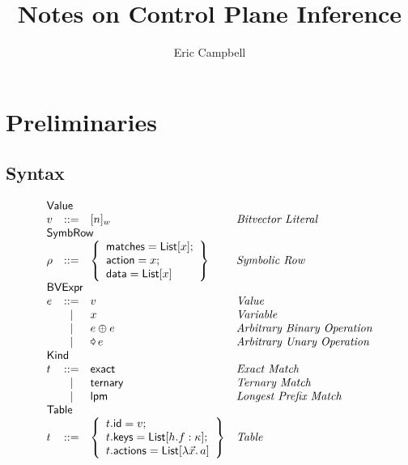 \documentclass{article}
\title{Notes on Control Plane Inference}
\author{Eric Campbell}
\newcommand{\binop}{\mathbin{\oplus}}
\newcommand{\unop}{\mathop{\text{\pointer}}}
\newcommand{\Value}{\mathsf{Value}}
\newcommand{\BVExpr}{\mathsf{BVExpr}}
\newcommand{\Table}{\mathsf{Table}}
\newcommand{\List}{\mathsf{List}}
\newcommand{\SymbRow}{\mathsf{SymbRow}}
\newcommand{\Kind}{\mathsf{Kind}}
\newcommand{\matches}{\mathsf{matches}}
\newcommand{\action}{\mathsf{action}}
\newcommand{\actions}{\mathsf{actions}}
\newcommand{\keys}{\mathsf{keys}}
\newcommand{\data}{\mathsf{data}}
\newcommand{\id}{\mathsf{id}}
\newcommand{\exact}{\ensuremath{\mathsf{exact}}}
\newcommand{\ternary}{\ensuremath{\mathsf{ternary}}}
\newcommand{\lpm}{\ensuremath{\mathsf{lpm}}}
\begin{document}
\maketitle

\section{Preliminaries}

\subsection{Syntax}

\begin{figure}[htp]
  \[\begin{array}{lclll}
    \multicolumn{3}{l}{\Value} \\
    v & ::= & [n]_w  & \textit{Bitvector Literal} \\
    \multicolumn{3}{l}{\SymbRow} \\
    \rho & ::= & \left\{
    \begin{array}{l}
      \matches = \List[x];\\
      \action = x;\\
      \data = \List[x]
    \end{array}\right\} & \textit{Symbolic Row} \\
    \multicolumn{3}{l}{\BVExpr} \\
    e & ::= & v & \textit{Value} \\
      & \mid & x & \textit{Variable}\\
      & \mid & e \binop e & \textit{Arbitrary Binary Operation}\\
    & \mid & \unop e & \textit{Arbitrary Unary Operation} \\
    \multicolumn{3}{l}{\Kind} \\
    t & ::= & \exact  & \textit{Exact Match}\\
    & \mid & \ternary & \textit{Ternary Match} \\
    & \mid & \lpm & \textit{Longest Prefix Match} \\
    \multicolumn{3}{l}{\Table} \\
    t & ::= & \left\{\begin{array}{l}
    t.\id = v; \\
    t.\keys = \List[h.f : \kappa]; \\
    t.\actions = \List[\lambda \vec x.\,a]\\
    \end{array}\right\} & \textit{Table}\\

\end{array}\]
\end{figure}
\end{document}
